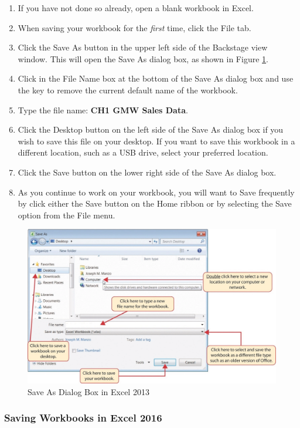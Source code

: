 \begin{enumerate}
	\item If you have not done so already, open a blank workbook in Excel.
	\item When saving your workbook for the \textit{first} time, click the File tab.
	\item Click the Save As button in the upper left side of the Backstage view window. This will open the Save As dialog box, as shown in Figure \ref{01:fig11}.
	\item Click in the File Name box at the bottom of the Save As dialog box and use the  key to remove the current default name of the workbook.
	\item Type the file name: \textbf{CH1 GMW Sales Data}.
	\item Click the Desktop button on the left side of the Save As dialog box if you wish to save this file on your desktop. If you want to save this workbook in a different location, such as a USB drive, select your preferred location.
	\item Click the Save button on the lower right side of the Save As dialog box.
	\item As you continue to work on your workbook, you will want to Save frequently by click either the Save button on the Home ribbon or by selecting the Save option from the File menu.
\end{enumerate}

\begin{figure}[H]
	\centering
	\includegraphics[width=\maxwidth{.95\linewidth}]{gfx/ch01_fig11}
	\caption{Save As Dialog Box in Excel 2013}
	\label{01:fig11}
\end{figure}

\subsubsection{Saving Workbooks in Excel 2016}

